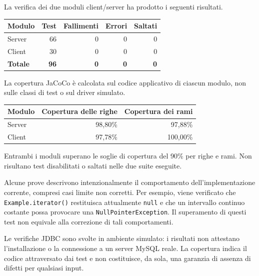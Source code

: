 \documentclass[11pt,a4paper]{article}
\begin{document}
La verifica dei due moduli client/server ha prodotto i seguenti risultati.

\begin{center}
\begin{tabular}{lrrrr}
\toprule
\textbf{Modulo} & \textbf{Test} & \textbf{Fallimenti} & \textbf{Errori} & \textbf{Saltati} \\
\midrule
Server & 66 & 0 & 0 & 0 \\
Client & 30 & 0 & 0 & 0 \\
\midrule
\textbf{Totale} & \textbf{96} & \textbf{0} & \textbf{0} & \textbf{0} \\
\bottomrule
\end{tabular}
\end{center}

La copertura JaCoCo è calcolata sul codice applicativo di ciascun modulo, non
sulle classi di test o sul driver simulato.

\begin{center}
\begin{tabular}{lrr}
\toprule
\textbf{Modulo} & \textbf{Copertura delle righe} & \textbf{Copertura dei rami} \\
\midrule
Server & 98,80\% & 97,88\% \\
Client & 97,78\% & 100,00\% \\
\bottomrule
\end{tabular}
\end{center}

Entrambi i moduli superano le soglie di copertura del 90\% per righe e rami.
Non risultano test disabilitati o saltati nelle due suite eseguite.

Alcune prove descrivono intenzionalmente il comportamento dell'implementazione
corrente, compresi casi limite non corretti. Per esempio, viene verificato che
\texttt{Example.iterator()} restituisca attualmente \texttt{null} e che un
intervallo continuo costante possa provocare una \texttt{NullPointerException}.
Il superamento di questi test non equivale alla correzione di tali comportamenti.

Le verifiche JDBC sono svolte in ambiente simulato: i risultati non attestano
l'installazione o la connessione a un server MySQL reale. La copertura indica il
codice attraversato dai test e non costituisce, da sola, una garanzia di assenza
di difetti per qualsiasi input.
\end{document}
